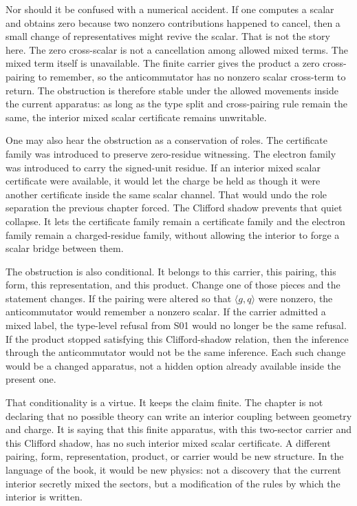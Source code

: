 Nor should it be confused with a numerical accident. If one computes a scalar
and obtains zero because two nonzero contributions happened to cancel, then a
small change of representatives might revive the scalar. That is not the story
here. The zero cross-scalar is not a cancellation among allowed mixed terms.
The mixed term itself is unavailable. The finite carrier gives the product a
zero cross-pairing to remember, so the anticommutator has no nonzero scalar
cross-term to return. The obstruction is therefore stable under the allowed
movements inside the current apparatus: as long as the type split and
cross-pairing rule remain the same, the interior mixed scalar certificate
remains unwritable.

One may also hear the obstruction as a conservation of roles. The certificate
family was introduced to preserve zero-residue witnessing. The electron family
was introduced to carry the signed-unit residue. If an interior mixed scalar
certificate were available, it would let the charge be held as though it were
another certificate inside the same scalar channel. That would undo the role
separation the previous chapter forced. The Clifford shadow prevents that
quiet collapse. It lets the certificate family remain a certificate family and
the electron family remain a charged-residue family, without allowing the
interior to forge a scalar bridge between them.

The obstruction is also conditional. It belongs to this carrier, this pairing,
this form, this representation, and this product. Change one of those pieces
and the statement changes. If the pairing were altered so that
\(\langle g,q\rangle\) were nonzero, the anticommutator would remember a
nonzero scalar. If the carrier admitted a mixed label, the type-level refusal from
S01 would no longer be the same refusal. If the product stopped satisfying this
Clifford-shadow relation, then the inference through the anticommutator would
not be the same inference. Each such change would be a changed apparatus, not a
hidden option already available inside the present one.

That conditionality is a virtue. It keeps the claim finite. The chapter is not
declaring that no possible theory can write an interior coupling between
geometry and charge. It is saying that this finite apparatus, with this
two-sector carrier and this Clifford shadow, has no such interior mixed scalar
certificate. A different pairing, form, representation, product, or carrier
would be new structure. In the language of the book, it would be new physics:
not a discovery that the current interior secretly mixed the sectors, but a
modification of the rules by which the interior is written.


